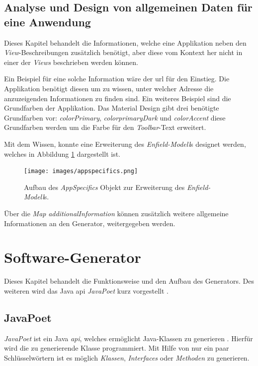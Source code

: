 \subsection{Analyse und Design von allgemeinen Daten für eine Anwendung}

Dieses Kapitel behandelt die Informationen, welche eine Applikation neben den \textit{View}-Beschreibungen zusätzlich benötigt, aber diese vom Kontext her nicht in einer der \textit{Views} beschrieben werden können.

Ein Beispiel für eine solche Information wäre der \acf{url} für den Einstieg. Die Applikation benötigt diesen um zu wissen, unter welcher Adresse die anzuzeigenden Informationen zu finden sind. Ein weiteres Beispiel sind die Grundfarben der Applikation. Das Material Design gibt drei benötigte Grundfarben vor: \textit{colorPrimary}, \textit{colorprimaryDark} und \textit{colorAccent} diese Grundfarben werden um die Farbe für den \textit{Toolbar}-Text erweitert.

Mit dem Wissen, konnte eine Erweiterung des \textit{Enfield-Modell}s designet werden, welches in Abbildung \ref{fig:appspecifics} dargestellt ist.

\begin{figure}[H]
	\begin{center}
		\texttt{[image: images/appspecifics.png]}
		\caption{Aufbau des \textit{AppSpecifics} Objekt  zur Erweiterung des \textit{Enfield-Modell}s.}
		\label{fig:appspecifics}
	\end{center}
\end{figure}

 Über die \textit{Map} \textit{additionalInformation} können zusätzlich weitere allgemeine Informationen an den Generator, weitergegeben werden.

\section{Software-Generator}

Dieses Kapitel behandelt die Funktionsweise und den Aufbau des Generators. Des weiteren wird das Java \acf{api} \textit{JavaPoet} kurz vorgestellt \cite{poet}.

\subsection{JavaPoet}
\textit{JavaPoet} ist ein Java \textit{\ac{api}}, welches ermöglicht Java-Klassen zu generieren \cite{poet}. Hierfür wird die zu generierende Klasse programmiert. Mit Hilfe von nur ein paar Schlüsselwörtern ist es möglich \textit{Klassen}, \textit{Interfaces} oder \textit{Methoden} zu generieren. 

